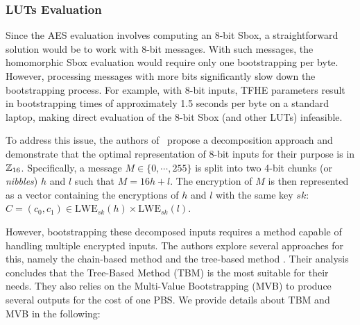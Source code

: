 \subsubsection{LUTs Evaluation} 
Since the AES evaluation involves computing an 8-bit Sbox, a straightforward solution would be to work with 8-bit messages. With such messages, the homomorphic Sbox evaluation would require only one bootstrapping per byte. However, processing messages with more bits significantly slow down the bootstrapping process. For example, with 8-bit inputs, TFHE parameters result in bootstrapping times of approximately 1.5 seconds per byte on a standard laptop, making direct evaluation of the 8-bit Sbox (and other LUTs) infeasible.

To address this issue, the authors of~\cite{DBLP:conf/wahc/TramaCBS23} propose a decomposition approach and demonstrate that the optimal representation of 8-bit inputs for their purpose is in $\mathbb{Z}_{16}$. Specifically, a message $M \in \{0, \cdots, 255\}$ is split into two 4-bit chunks (or \emph{nibbles}) $h$ and $l$ such that $M = 16h+l$. The encryption of $M$ is then represented as a vector containing the encryptions of $h$ and $l$ with the same key $sk$: $C=(c_0,c_1) \in \mathrm{LWE}_{sk}(h) \times \mathrm{LWE}_{sk}(l)$. 

However, bootstrapping these decomposed inputs requires a method capable of handling multiple encrypted inputs. The authors explore several approaches for this, namely the chain-based method and the tree-based method \cite{TCHES:GuiBorAra21}. Their analysis concludes that the Tree-Based Method (TBM) is the most suitable for their needs. They also relies on the Multi-Value Bootstrapping (MVB) to produce several outputs for the cost of one PBS. We provide details about TBM and MVB in the following:

